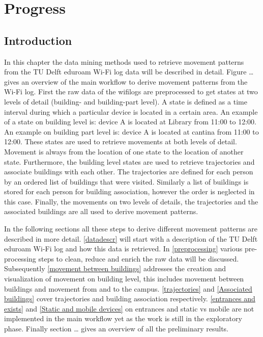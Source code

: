 \chapter{Progress}
\section{Introduction}
In this chapter the data mining methods used to retrieve movement patterns from the TU Delft eduroam Wi-Fi log data will be described in detail. Figure … gives an overview of the main workflow to derive movement patterns from the Wi-Fi log. First the raw data of the wifilogs are preprocessed to get states at two levels of detail (building- and building-part level). A state is defined as a time interval during which a particular device is located in a certain area. An example of a state on building level is: device A is located at Library from 11:00 to 12:00. An example on building part level is: device A is located at cantina from 11:00 to 12:00. These states are used to retrieve movements at both levels of detail. Movement is always from the location of one state to the location of another state. Furthermore, the building level states are used to retrieve trajectories and associate buildings with each other. The trajectories are defined for each person by an ordered list of buildings that were visited. Similarly a list of buildings is stored for each person for building association, however the order is neglected in this case. Finally, the movements on two levels of details, the trajectories and the associated buildings are all used to derive movement patterns.

In the following sections all these steps to derive different movement patterns are described in more detail. \autoref{datadescr} will start with a description of the TU Delft eduroam Wi-Fi log and how this data is retrieved. In \autoref{preprocessing} various pre-processing steps to clean, reduce and enrich the raw data will be discussed. Subsequently \autoref{movement between buildings} addresses the creation and visualization of movement on building level, this includes movement between buildings and movement from and to the campus.  \autoref{trajectories} and \autoref{Associated buildings} cover trajectories and building association respectively. \autoref{entrances and exists} and \autoref{Static and mobile devices} on entrances and static vs mobile are not implemented in the main workflow yet as the work is still in the exploratory phase. Finally section … gives an overview of all the preliminary results.

